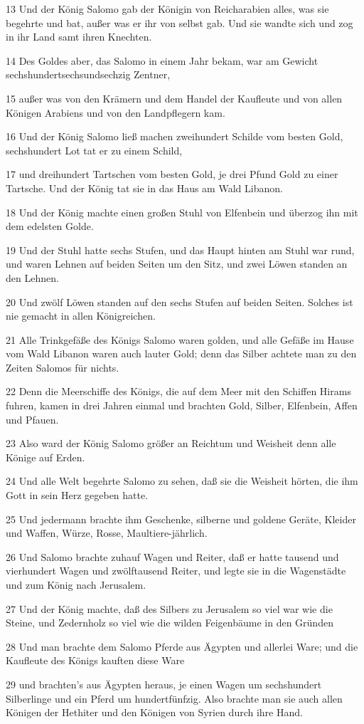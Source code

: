 \par 13 Und der König Salomo gab der Königin von Reicharabien alles, was sie begehrte und bat, außer was er ihr von selbst gab. Und sie wandte sich und zog in ihr Land samt ihren Knechten.
\par 14 Des Goldes aber, das Salomo in einem Jahr bekam, war am Gewicht sechshundertsechsundsechzig Zentner,
\par 15 außer was von den Krämern und dem Handel der Kaufleute und von allen Königen Arabiens und von den Landpflegern kam.
\par 16 Und der König Salomo ließ machen zweihundert Schilde vom besten Gold, sechshundert Lot tat er zu einem Schild,
\par 17 und dreihundert Tartschen vom besten Gold, je drei Pfund Gold zu einer Tartsche. Und der König tat sie in das Haus am Wald Libanon.
\par 18 Und der König machte einen großen Stuhl von Elfenbein und überzog ihn mit dem edelsten Golde.
\par 19 Und der Stuhl hatte sechs Stufen, und das Haupt hinten am Stuhl war rund, und waren Lehnen auf beiden Seiten um den Sitz, und zwei Löwen standen an den Lehnen.
\par 20 Und zwölf Löwen standen auf den sechs Stufen auf beiden Seiten. Solches ist nie gemacht in allen Königreichen.
\par 21 Alle Trinkgefäße des Königs Salomo waren golden, und alle Gefäße im Hause vom Wald Libanon waren auch lauter Gold; denn das Silber achtete man zu den Zeiten Salomos für nichts.
\par 22 Denn die Meerschiffe des Königs, die auf dem Meer mit den Schiffen Hirams fuhren, kamen in drei Jahren einmal und brachten Gold, Silber, Elfenbein, Affen und Pfauen.
\par 23 Also ward der König Salomo größer an Reichtum und Weisheit denn alle Könige auf Erden.
\par 24 Und alle Welt begehrte Salomo zu sehen, daß sie die Weisheit hörten, die ihm Gott in sein Herz gegeben hatte.
\par 25 Und jedermann brachte ihm Geschenke, silberne und goldene Geräte, Kleider und Waffen, Würze, Rosse, Maultiere-jährlich.
\par 26 Und Salomo brachte zuhauf Wagen und Reiter, daß er hatte tausend und vierhundert Wagen und zwölftausend Reiter, und legte sie in die Wagenstädte und zum König nach Jerusalem.
\par 27 Und der König machte, daß des Silbers zu Jerusalem so viel war wie die Steine, und Zedernholz so viel wie die wilden Feigenbäume in den Gründen
\par 28 Und man brachte dem Salomo Pferde aus Ägypten und allerlei Ware; und die Kaufleute des Königs kauften diese Ware
\par 29 und brachten's aus Ägypten heraus, je einen Wagen um sechshundert Silberlinge und ein Pferd um hundertfünfzig. Also brachte man sie auch allen Königen der Hethiter und den Königen von Syrien durch ihre Hand.

